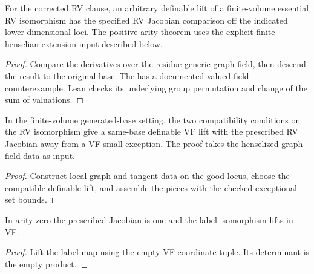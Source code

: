 \begin{lemma}
\label{lem:rv-jacobian-comparison}
\leanok
For the corrected RV clause, an arbitrary definable lift of a
finite-volume essential RV isomorphism has the specified RV
Jacobian comparison off the indicated lower-dimensional loci.
The positive-arity theorem uses the explicit finite henselian
extension input described below.
\end{lemma}
\begin{proof}
\leanok
{}
Compare the derivatives over the residue-generic graph field,
then descend the result to the original base. The
has a documented valued-field counterexample. Lean checks its
underlying group permutation and change of the sum of valuations.
\end{proof}

\begin{theorem}
\label{thm:prescribed-lift}
\leanok
In the finite-volume generated-base setting, the two compatibility
conditions on the RV isomorphism give a same-base definable VF lift
with the prescribed RV Jacobian away from a VF-small exception.
The proof takes the henselized graph-field data as input.
\end{theorem}
\begin{proof}
\leanok
{}
Construct local graph and tangent data on the good locus, choose
the compatible definable lift, and assemble the pieces with the
checked exceptional-set bounds.
\end{proof}

\begin{theorem}
\label{thm:prescribed-lift-zero}
\leanok
In arity zero the prescribed Jacobian is one and the label
isomorphism lifts in VF.
\end{theorem}
\begin{proof}
\leanok
{}
Lift the label map using the empty VF coordinate tuple. Its
determinant is the empty product.
\end{proof}

